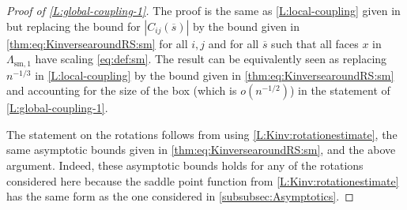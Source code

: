 \documentclass[11pt,twoside]{amsart}
\theoremstyle{plain}
\numberwithin{quest}{section}
\theoremstyle{remark}
\numberwithin{rem}{section}
\theoremstyle{definition}
\begin{document}
	
	
	\begin{proof}[Proof of \cref{L:global-coupling-1}]
		The proof is the same as \cref{L:local-coupling} given in \cite[Proposition 4.5]{BCJ22} but replacing the bound for $|C_{ij}(\overline{s})|$ by the bound given in \eqref{thm:eq:KinversearoundRS:sm} for all $i,j$ and for all $\overline{s}$ such that all faces $x$ in $\Lambda_{\mathrm{sm},1}$ have scaling  \eqref{eq:def:sm}.    The result can be equivalently seen as replacing $n^{-1/3}$ in \cref{L:local-coupling} by the bound given in \eqref{thm:eq:KinversearoundRS:sm} and accounting for the size of the box (which is $o(n^{-1/2})$) in the statement of \cref{L:global-coupling-1}.
		
		The statement on the rotations follows from using \cref{L:Kinv:rotationestimate}, the same asymptotic bounds given in \eqref{thm:eq:KinversearoundRS:sm}, and the above argument. Indeed, these asymptotic bounds holds for any of the rotations considered here because the saddle point function from \cref{L:Kinv:rotationestimate} has the same form as the one considered in \cref{subsubsec:Asymptotics}.
	\end{proof}
\end{document}
